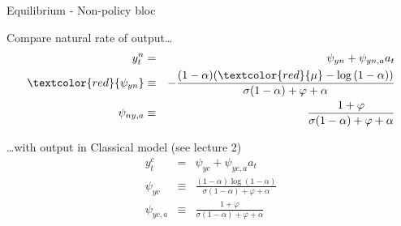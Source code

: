 \documentclass{beamer}
\begin{document}

	
\begin{frame}{Equilibrium - Non-policy bloc}

Compare natural rate of output\ldots
\begin{eqnarray*}
y^{n}_{t} 	&=& 		\psi_{yn} + \psi_{yn,a} a_{t} \\
\textcolor{red}{\psi_{yn}} 	&\equiv& 	-\frac{(1-\alpha)(\textcolor{red}{\mu}-\log{(1-\alpha)})}{\sigma(1-\alpha)+\varphi+\alpha} \\
\psi_{ny,a}	&\equiv& 	\frac{1+\varphi}{\sigma(1-\alpha) + \varphi + \alpha}
\end{eqnarray*}

\ldots with output in Classical model (see lecture 2)
\begin{eqnarray*}
y^{c}_{t} 		&=& 		\psi_{yc} + \psi_{yc,a} a_{t} \\
\psi_{yc} 		&\equiv& 	\frac{(1-\alpha)\log{(1-\alpha)}}{\sigma(1-\alpha)+\varphi+\alpha} \\
\psi_{yc,a}		&\equiv& 	\frac{1+\varphi}{\sigma(1-\alpha) + \varphi + \alpha}
\end{eqnarray*}

\end{frame}


	
\end{document}
